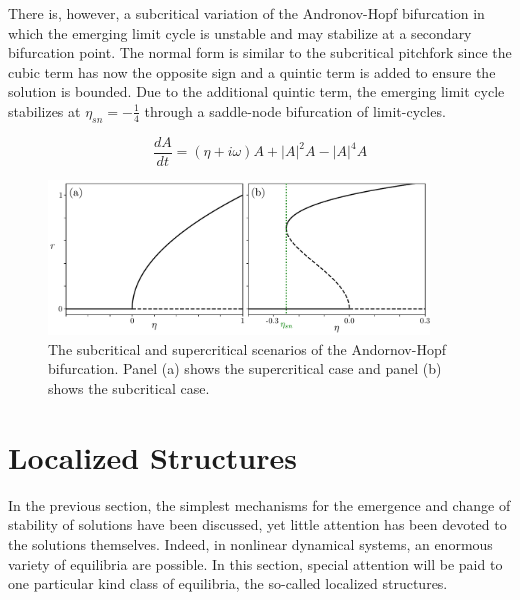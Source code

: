 There is, however, a subcritical variation
of the Andronov-Hopf bifurcation in which the emerging limit cycle is unstable and may stabilize at a secondary bifurcation point.
The normal form is similar to the subcritical pitchfork since the cubic term has now the opposite sign and a quintic term is added to ensure the solution is bounded.
Due to the additional quintic term, the emerging limit cycle stabilizes at $\eta_{sn} = -\frac14$ through
a saddle-node bifurcation of limit-cycles.

\begin{equation}
    \dfrac{dA}{dt} = (\eta + i\omega) A + |A|^2 A - |A|^4A
\end{equation}

\begin{figure}[h]
    \centering
    \includegraphics[width=0.9\textwidth]{imagenes/framework/hopf_supersub.pdf}
    \caption{The subcritical and supercritical scenarios of the Andornov-Hopf
    bifurcation. Panel (a) shows the supercritical case and panel (b) shows the subcritical
    case.}
\end{figure}

\section{Localized Structures}
\label{sec:fra_LS}

In the previous section, the simplest mechanisms for the emergence and
change of stability of solutions have been discussed, yet little attention
has been devoted to the solutions themselves. Indeed, in nonlinear dynamical
systems, an enormous variety of equilibria are possible. In this section,
special attention will be paid to one particular kind class of equilibria,
the so-called localized structures. 


